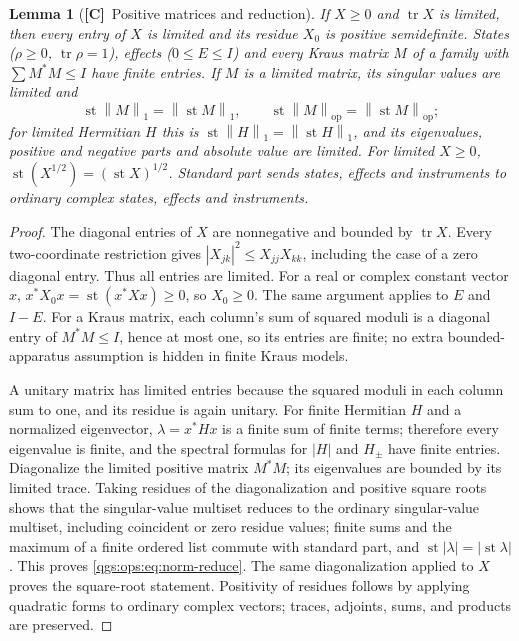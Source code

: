 \documentclass[11pt,oneside]{article}
\numberwithin{equation}{section}
\theoremstyle{plain}
\newtheorem{lemma}[lemma]{Lemma}
\theoremstyle{definition}
\theoremstyle{remark}
\DeclareMathOperator{\st}{st}
\DeclareMathOperator{\tr}{tr}
\newcommand{\op}{\mathrm{op}}
\newcommand{\abs}[1]{\left|#1\right|}
\newcommand{\norm}[1]{\left\|#1\right\|}
\newcommand{\TC}{\textcolor{TierC}{\textsf{\bfseries[C]}}}
\begin{document}
\begin{lemma}[\TC\ Positive matrices and reduction]\label{qgs:lem:finitequantum}
If $X\ge0$ and $\tr X$ is limited, then every entry of $X$ is limited and its residue $X_0$ is positive semidefinite. States ($\rho\ge0$, $\tr\rho=1$), effects ($0\le E\le I$) and every Kraus matrix $M$ of a family with $\sum M^*M\le I$ have finite entries. If $M$ is a limited matrix, its singular values are limited and
\begin{equation}\label{qgs:ops:eq:norm-reduce}
 \st\norm M_1=\norm{\st M}_1,\qquad
 \st\norm M_\op=\norm{\st M}_\op;
\end{equation}
for limited Hermitian $H$ this is $\st\norm H_1=\norm{\st H}_1$, and its eigenvalues, positive and negative parts and absolute value are limited. For limited $X\ge0$, $\st(X^{1/2})=(\st X)^{1/2}$. Standard part sends states, effects and instruments to ordinary complex states, effects and instruments.
\end{lemma}
\begin{proof}
The diagonal entries of $X$ are nonnegative and bounded by $\tr X$. Every two-coordinate restriction gives $\abs{X_{jk}}^2\le X_{jj}X_{kk}$, including the case of a zero diagonal entry. Thus all entries are limited. For a real or complex constant vector $x$, $x^*X_0x=\st(x^*Xx)\ge0$, so $X_0\ge0$. The same argument applies to $E$ and $I-E$. For a Kraus matrix, each column's sum of squared moduli is a diagonal entry of $M^*M\le I$, hence at most one, so its entries are finite; no extra bounded-apparatus assumption is hidden in finite Kraus models.

A unitary matrix has limited entries because the squared moduli in each column sum to one, and its residue is again unitary. For finite Hermitian $H$ and a normalized eigenvector, $\lambda=x^*Hx$ is a finite sum of finite terms; therefore every eigenvalue is finite, and the spectral formulas for $\abs H$ and $H_\pm$ have finite entries. Diagonalize the limited positive matrix $M^*M$; its eigenvalues are bounded by its limited trace. Taking residues of the diagonalization and positive square roots shows that the singular-value multiset reduces to the ordinary singular-value multiset, including coincident or zero residue values; finite sums and the maximum of a finite ordered list commute with standard part, and $\st\abs\lambda=\abs{\st\lambda}$. This proves \eqref{qgs:ops:eq:norm-reduce}. The same diagonalization applied to $X$ proves the square-root statement. Positivity of residues follows by applying quadratic forms to ordinary complex vectors; traces, adjoints, sums, and products are preserved.
\end{proof}
\end{document}
